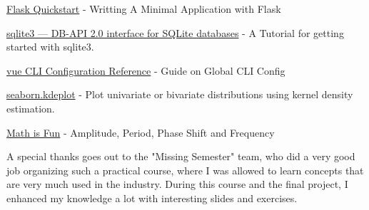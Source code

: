 \documentclass[sn-mathphys-num]{sn-jnl}%
\theoremstyle{thmstyleone}%
\theoremstyle{thmstyletwo}%
\theoremstyle{thmstylethree}%
\begin{document}
\begin{enumerate}
     \href{https://flask.palletsprojects.com/en/3.0.x/quickstart/}{Flask Quickstart} - Writting A Minimal Application with Flask

     \href{https://docs.python.org/3/library/sqlite3.html}{sqlite3 — DB-API 2.0 interface for SQLite databases} - A Tutorial for getting started with sqlite3.

     \href{https://cli.vuejs.org/config/}{vue CLI Configuration Reference} - Guide on Global CLI Config 
    
     \href{https://seaborn.pydata.org/generated/seaborn.kdeplot.html}{seaborn.kdeplot} - Plot univariate or bivariate distributions using kernel density estimation.

     \href{https://www.mathsisfun.com/algebra/amplitude-period-frequency-phase-shift.html}{Math is Fun} - Amplitude, Period, Phase Shift and Frequency

\end{enumerate}

 A special thanks goes out to the "Missing Semester" team, who did a very good job organizing such a practical course, where I was allowed to learn concepts that are very much used in the industry. During this course and the final project, I enhanced my knowledge a lot with interesting slides and exercises.



\begin{table}[]
\label{tab:proj-topics}
\end{table}
\bigskip\noindent


\end{document}
